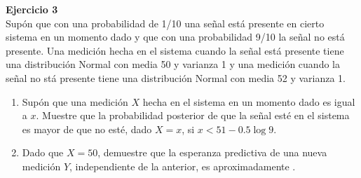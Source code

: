 \documentclass[a4paper, 11pt]{article}
\newenvironment{problem}[2][Ejercicio]
{ \begin{mdframed}[backgroundcolor= red!50] \textbf{#1 #2} \\}
	{  \end{mdframed}}
\begin{document}

\begin{problem}{3}       
    Supón que con una probabilidad de 1/10  una señal está presente en cierto sistema en un momento dado y que con una probabilidad 9/10 la señal no está presente. Una medición hecha en el sistema cuando la señal está presente tiene una distribución Normal con media 50 y varianza 1 y una medición cuando la señal no stá presente tiene una distribución Normal con media 52 y varianza 1.
    \begin{enumerate}
        \item Supón que una medición $X$ hecha en el sistema en un momento dado es igual a $x$. Muestre que la probabilidad posterior de que la señal esté en el sistema es mayor de que no esté, dado $X = x$, si $x < 51 - \text{0.5} \log 9$.
        \item Dado que $X = 50$, demuestre que la esperanza predictiva de una nueva medición $Y$, independiente de la anterior, es aproximadamente  .
    \end{enumerate}
\end{problem}
\end{document}
